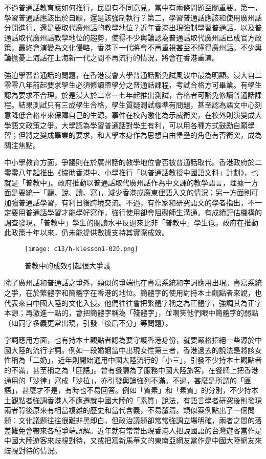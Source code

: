 不過普通話教育應如何推行，民間有不同意見，當中有兩條問題至關重要。第一，學習普通話應該出於自願，還是該強制執行？第二，學習普通話應該和使用廣州話分開進行，還是要取代廣州話的教學地位？近年香港出現強制學習普通話，以及普通話取代廣州話教學地位的趨勢，使得不少輿論認為普通話取代廣州話已成官方政策，最終會演變為文化侵略，香港下一代將會不再重視甚至不懂得廣州話。不少輿論擔憂上海話在上海新一代之間不再流行的情況，將會在香港重演。

強迫學習普通話的問題，在香港浸會大學普通話豁免試風波中最為明顯。浸大自二零零八年前起要求學生必須修讀帶學分之普通話課程，考試合格方可畢業。有學生認為要求不合理，於是浸大於二零一七年起推出測試，合格者可豁免修讀普通話課程。結果測試只有三成學生合格，學生質疑測試標準有問題，甚至認為語文中心刻意降低合格率來保障自己的生源。事件在校內激化為示威衝突，在校外則演變成大學語文政策之爭。大學認為學習普通話對學生有利，可以用各種方式鼓勵自願學習；但將之變成畢業的要求，和大學本身作為思想自由堡壘的角色有否衝突，成為關注焦點。

中小學教育方面，爭議則在於廣州話的教學地位會否被普通話取代。香港政府於二零零八年起推出《協助香港中、小學推行「以普通話教授中國語文科」計劃》，也就是「普教中」。政府推動以普通話取代廣州話作為中文課的教學語言，理據一方面是要統一「聽、說、讀、寫」，減少香港或廣東俚語入文的情況；另一方面則可加強普通話學習，有利日後跨境交流。不過，有作家和研究語文的學者指出，不一定要用普通話學習才能學好寫作，強行使用卻會阻礙師生溝通。有成績評估機構的調查發現，「普教中」學生的閱讀水平反過來比非「普教中」學生低。政府在推動此政策十年以來，仍未能提供數據支持其實際成效。

\begin{figure}[htbp]
    \centering
    \texttt{[image: c13/h-klesson1-020.png]}
    \caption{普教中的成效引起很大爭議} 
\end{figure}

除了廣州話和普通話之爭外，類似的爭端也在書寫系統和字詞應用出現。書寫系統之爭，在於繁體字和簡體字在香港的地位。簡體字的使用對持本土觀點者來說，也代表來自中國大陸的文化入侵。他們往往會把繁體字稱之為正體字，強調其為正字本源；再激進一點的，會把簡體字稱為「殘體字」，並嘲笑他們眼中簡體字的弱點（如同字多義更常出現，引發「後后不分」等問題）。

字詞應用方面，也有持本土觀點者認為要守護香港身份，就要嚴格拒絕一些源於中國大陸的流行字詞。例如一段婚姻當中出現女性第三者，香港過去的說法是將該女性稱為「二奶」，近年則開始通用中國大陸流行的「小三」，引發不少持本土觀點者的不滿，甚至稱之為「匪語」。曾有餐廳為了服務中國大陸旅客，在餐牌上把香港通用的「沙律」寫成「沙拉」，亦引發輿論強列不滿。不過，甚麼是所謂的「匪語」，甚麼才不是，有時也不易回答。例如「質素」和「素質」的分別，不少持本土觀點者強調香港人不應遷就中國大陸的「素質」說法，有語言學者研究後則發現兩者背後原來有相當複雜的歷史和當代含義，不易釐清。類似案例點出了一個問題：文化議題往往很難非黑即白，但政治議題卻常常強調立場明確，兩者之間的落差難免會帶來各種爭端誤解。近年就有常常出現香港人把說國語的台灣遊客當作是中國大陸遊客來歧視對待，又或把寫新馬華文的東南亞網友當作是中國大陸網友來歧視對待的情況。

